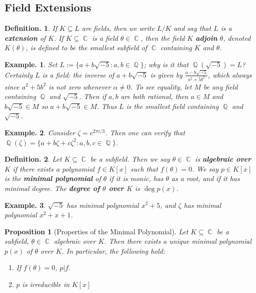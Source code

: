 \documentclass[11pt, a4paper]{memoir}
\DeclareMathOperator{\Q}{{\mathbb{Q}}}
\DeclareMathOperator{\C}{{\mathbb{C}}}
\theoremstyle{change}
\newtheorem{proposition}[theorem]{Proposition}
\theoremstyle{plain}
\theoremstyle{nonumberplain}
\newtheorem{definition}{Definition.}
\newtheorem{example}{Example.}
\begin{document}
\subsection{Field Extensions}
\begin{definition}
    If $K\subseteq L$ are fields, then we write $L/K$ and say that $L$ is a \textbf{extension} of $K$.
    If $K\subseteq\C$ is a field $\theta\in\C$, then the field $K$ \textbf{adjoin} $\theta$, denoted $K(\theta)$, is defined to be the smallest subfield of $\C$ containing $K$ and $\theta$.
\end{definition}
\begin{example}
    Set $L:=\{a+b\sqrt{-5}:a,b\in\Q\}$; why is it that $\Q(\sqrt{-5})=L$?
    Certainly $L$ is a field: the inverse of $a+b\sqrt{-5}$ is given by $\frac{a-b\sqrt{-5}}{a^2+5b^2}$, which always since $a^2+5b^2$ is not zero whenever $\alpha\neq 0$.
    To see equality, let $M$ be any field containing $\Q$ and $\sqrt{-5}$.
    Then if $a,b$ are both rational, then $a\in M$ and $b\sqrt{-5}\in M$ so $a+b\sqrt{-5}\in M$.
    Thus $L$ is the smallest field containing $\Q$ and $\sqrt{-5}$.
\end{example}
\begin{example}
    Consider $\zeta=e^{2\pi i/3}$.
    Then one can verify that $\Q(\zeta)=\{a+b\zeta+c\zeta^2:a,b,c\in\Q\}$.
\end{example}
\begin{definition}
    Let $K\subseteq\C$ be a subfield.
    Then we say $\theta\in\C$ is \textbf{algebraic over $K$} if there exists a polynomial $f\in K[x]$ such that $f(\theta)=0$.
    We say $p\in K[x]$ is the \textbf{minimal polynomial} of $\theta$ if it is monic, has $\theta$ as a root, and if it has minimal degree.
    The \textbf{degree of $\theta$ over $K$} is $\deg p(x)$.
\end{definition}
\begin{example}
    $\sqrt{-5}$ has minimal polynomial $x^2+5$, and $\zeta$ has minimal polynomial $x^2+x+1$.
\end{example}
\begin{proposition}[Properties of the Minimal Polynomial]
    Let $K\subseteq\C$ be a subfield, $\theta\in\C$ algebraic over $K$.
    Then there exists a unique minimal polynomial $p(x)$ of $\theta$ over $K$.
    In particular, the following hold:
    \begin{enumerate}[nolistsep]
        \item If $f(\theta)=0$, $p|f$.
        \item $p$ is irreducible in $K[x]$
    \end{enumerate}
\end{proposition}
\end{document}

